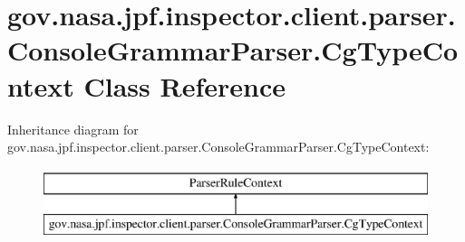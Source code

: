 \hypertarget{classgov_1_1nasa_1_1jpf_1_1inspector_1_1client_1_1parser_1_1_console_grammar_parser_1_1_cg_type_context}{}\section{gov.\+nasa.\+jpf.\+inspector.\+client.\+parser.\+Console\+Grammar\+Parser.\+Cg\+Type\+Context Class Reference}
\label{classgov_1_1nasa_1_1jpf_1_1inspector_1_1client_1_1parser_1_1_console_grammar_parser_1_1_cg_type_context}
Inheritance diagram for gov.\+nasa.\+jpf.\+inspector.\+client.\+parser.\+Console\+Grammar\+Parser.\+Cg\+Type\+Context\+:\begin{figure}[H]
\begin{center}
\leavevmode
\includegraphics[height=2.000000cm]{classgov_1_1nasa_1_1jpf_1_1inspector_1_1client_1_1parser_1_1_console_grammar_parser_1_1_cg_type_context}
\end{center}
\end{figure}
